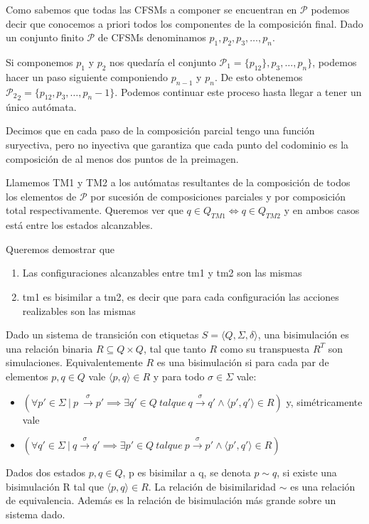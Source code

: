 Como sabemos que todas las CFSMs a componer se encuentran en $\mathcal{P}$ podemos decir que conocemos a priori todos los componentes de la composición final. Dado un conjunto finito $\mathcal{P}$ de CFSMs denominamos $ p_1, p_2, p_3, \ldots, p_n$. 

Si componemos $p_1$ y $p_2$ nos quedaría el conjunto $\mathcal{P}_1 =\{ p_{12} \}, p_3, \ldots, p_n \} $, podemos hacer un paso siguiente componiendo $p_{n-1}$ y $p_n$. De esto obtenemos $\mathcal{P_2}_2= \{ p_{12}, p_3, \ldots, p_n-1 \} $. Podemos continuar este proceso hasta llegar a tener un único autómata. %

Decimos que en cada paso de la composición parcial tengo una función suryectiva, pero no inyectiva que garantiza que cada punto del codominio es la composición de al menos dos puntos de la preimagen.

Llamemos TM1 y TM2 a los autómatas resultantes de la composición de todos los elementos de $\mathcal{P}$ por sucesión de composiciones parciales y por composición total respectivamente. Queremos ver que $ q \in Q_{TM1} \iff q \in Q_{TM2} $ y en ambos casos está entre los estados alcanzables. 

Queremos demostrar que
\begin{enumerate}
\item Las configuraciones alcanzables entre tm1 y tm2 son las mismas
\item tm1 es bisimilar a tm2, es decir que para cada configuración las acciones realizables son las mismas
\end{enumerate}

\begin{definition}[Bisimulación]
Dado un sistema de transición con etiquetas $ S =\langle Q, \Sigma, \delta \rangle $, una bisimulación es una relación binaria $R \subseteq Q \times Q$, tal que tanto $R$ como su transpuesta $R^T$ son simulaciones. Equivalentemente $R$ es una bisimulación si para cada par de elementos $p, q \in Q$ vale $\langle p, q \rangle \in R$ y para todo $\sigma \in \Sigma $ vale:
\begin{itemize}
    \item $(\forall p' \in \Sigma \  | \  p \ \overset{\sigma}{\rightarrow} p' \implies \exists q'\in Q \ \mathit{tal que} \ q \overset{\sigma}{\rightarrow} q' \land \langle p', q' \rangle \in R )$ y, simétricamente vale 
    \item $(\forall q' \in \Sigma \  | \  q \overset{\sigma}{\rightarrow} q' \implies \exists p'\in Q \ \mathit{tal que} \ p \overset{\sigma}{\rightarrow} p' \land \langle p', q' \rangle \in R ) $
\end{itemize}

Dados dos estados $p, q \in Q $, p es bisimilar a q, se denota $p \sim q $, si existe una bisimulación R tal que $\langle p,q \rangle \in R$. La relación de bisimilaridad $\sim$ es una relación de equivalencia. Además es la relación de bisimulación más grande sobre un sistema dado.

\end{definition}
